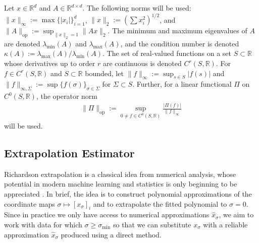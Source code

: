 \documentclass[10pt]{article} %
\newcommand{\nugget}{\sigma}
\newcommand{\nuggets}{\Sigma}
\begin{document}
Let $x \in \mathbb{R}^d$ and $A \in \mathbb{R}^{d \times d}$.
The following norms will be used: $\|x\|_\infty := \max\{|x_i|\}_{i=1}^d$, $\|x\|_2 := (\sum x_i^2)^{1/2}$, and $\|A\|_{\mathrm{op}} := \sup_{\|x\|_2 = 1} \|Ax\|_2$.
The minimum and maximum eigenvalues of $A$ are denoted $\lambda_{\min}(A)$ and $\lambda_{\max}(A)$, and the condition number is denoted $\kappa(A) := \lambda_{\max}(A) / \lambda_{\min}(A)$.
The set of real-valued functions on a set $S \subset \mathbb{R}$ whose derivatives up to order $r$ are continuous is denoted $C^r(S , \mathbb{R})$.
For $f \in C^r(S,\mathbb{R})$ and $S \subset \mathbb{R}$ bounded, let $\|f\|_\infty := \sup_{s \in S} |f(s)|$ and $\|f\|_{\infty,\nuggets} := \sup\{f(\nugget)\}_{\nugget \in \nuggets}$ for $\nuggets \subset S$.
Further, for a linear functional $\Pi$ on $C^0(S , \mathbb{R})$, the operator norm
\begin{align}
\|\Pi\|_{\mathrm{op}} := \sup_{0 \neq f \in C^0(S,\mathbb{R})} \frac{|\Pi(f)|}{\|f\|_\infty}    \label{eq: op norm}
\end{align}
will be used.


\subsection{Extrapolation Estimator}
\label{sec: extrap}

Richardson extrapolation \citep{richardson1911ix} is a classical idea from numerical analysis, whose potential in modern machine learning and statistics is only beginning to be appreciated \citep{bach2021effectiveness,oates2025probabilistic}.
In brief, the idea is to construct polynomial approximations of the coordinate maps $\nugget \mapsto [x_\nugget]_i$ and to extrapolate the fitted polynomial to $\nugget = 0$.
Since in practice we only have access to numerical approximations $\hat{x}_\nugget$, we aim to work with data for which $\nugget \geq \nugget_{\min}$ so that we can substitute $x_\nugget$ with a reliable approximation $\hat{x}_\nugget$ produced using a direct method.
\end{document}
